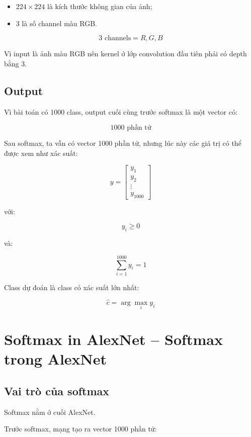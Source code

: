 \begin{itemize}
    \item $224\times224$ là kích thước không gian của ảnh;
    \item $3$ là số channel màu RGB.
\end{itemize}

\[
    3 \text{ channels} = R,G,B
\]

\begin{ghinho}
Vì input là ảnh màu RGB nên kernel ở lớp convolution đầu tiên phải có depth bằng 3.
\end{ghinho}

\subsection{Output}

Vì bài toán có 1000 class, output cuối cùng trước softmax là một vector có:

\[
    1000 \text{ phần tử}
\]

Sau softmax, ta vẫn có vector 1000 phần tử, nhưng lúc này các giá trị có thể được xem như xác suất:

\[
    y =
    \begin{bmatrix}
    y_1\\
    y_2\\
    \vdots\\
    y_{1000}
    \end{bmatrix}
\]

với:

\[
    y_i \geq 0
\]

và:

\[
    \sum_{i=1}^{1000} y_i = 1
\]

Class dự đoán là class có xác suất lớn nhất:

\[
    \hat{c}=\arg\max_i y_i
\]

\section{Softmax in AlexNet -- Softmax trong AlexNet}

\subsection{Vai trò của softmax}

Softmax nằm ở cuối AlexNet.

Trước softmax, mạng tạo ra vector 1000 phần tử:

